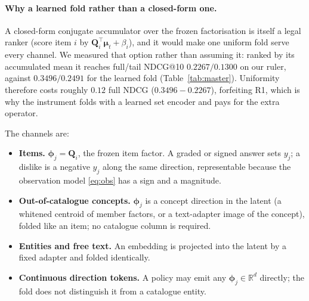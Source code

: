 \documentclass[manuscript,screen]{acmart}
\newcommand{\R}{\mathbb{R}}
\newcommand{\Q}{\mathbf{Q}}
\newcommand{\bphi}{\boldsymbol{\phi}}
\newcommand{\bmu}{\boldsymbol{\mu}}
\begin{document}
\paragraph{Why a learned fold rather than a closed-form one.} A closed-form conjugate accumulator over the frozen factorisation is itself a legal ranker (score item $i$ by $\Q_i^\top\bmu_t+\beta_i$), and it would make one uniform fold serve every channel. We measured that option rather than assuming it: ranked by its accumulated mean it reaches full/tail NDCG@10 $0.2267/0.1300$ on our ruler, against $0.3496/0.2491$ for the learned fold (Table~\ref{tab:master}). Uniformity therefore costs roughly $0.12$ full NDCG ($0.3496-0.2267$), forfeiting R1, which is why the instrument folds with a learned set encoder and pays for the extra operator.

The channels are:
\begin{itemize}[leftmargin=1.4em,itemsep=1.5pt]
  \item \textbf{Items.} $\bphi_j=\Q_i$, the frozen item factor. A graded or signed answer sets $y_j$; a dislike is a negative $y_j$ along the same direction, representable because the observation model \eqref{eq:obs} has a sign and a magnitude.
  \item \textbf{Out-of-catalogue concepts.} $\bphi_j$ is a concept direction in the latent (a whitened centroid of member factors, or a text-adapter image of the concept), folded like an item; no catalogue column is required.
  \item \textbf{Entities and free text.} An embedding is projected into the latent by a fixed adapter and folded identically.
  \item \textbf{Continuous direction tokens.} A policy may emit any $\bphi_j\in\R^{d}$ directly; the fold does not distinguish it from a catalogue entity.
\end{itemize}
\end{document}
